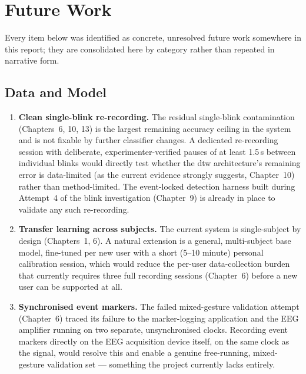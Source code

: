 \section{Future Work}
\label{sec:conc_future}

Every item below was identified as concrete, unresolved future work
somewhere in this report; they are consolidated here by category
rather than repeated in narrative form.

\subsection{Data and Model}

\begin{enumerate}[leftmargin=*]
    \item \textbf{Clean single-blink re-recording.} The residual
    single-blink contamination (Chapters~6, 10, 13) is the largest
    remaining accuracy ceiling in the system and is not fixable by
    further classifier changes. A dedicated re-recording session
    with deliberate, experimenter-verified pauses of at least
    1.5\,s between individual blinks would directly test whether
    the \acrshort{dtw} architecture's remaining error is
    data-limited (as the current evidence strongly suggests,
    Chapter~10) rather than method-limited. The event-locked
    detection harness built during Attempt~4 of the blink
    investigation (Chapter~9) is already in place to validate any
    such re-recording.
    \item \textbf{Transfer learning across subjects.} The current
    system is single-subject by design (Chapters~1, 6). A natural
    extension is a general, multi-subject base model, fine-tuned per
    new user with a short (5--10 minute) personal calibration
    session, which would reduce the per-user data-collection burden
    that currently requires three full recording sessions
    (Chapter~6) before a new user can be supported at all.
    \item \textbf{Synchronised event markers.} The failed
     mixed-gesture validation attempt (Chapter~6)
    traced its failure to the marker-logging application and the
    EEG amplifier running on two separate, unsynchronised clocks.
    Recording event markers directly on the EEG acquisition device
    itself, on the same clock as the signal, would resolve this and
    enable a genuine free-running, mixed-gesture validation set ---
    something the project currently lacks entirely.
\end{enumerate}

